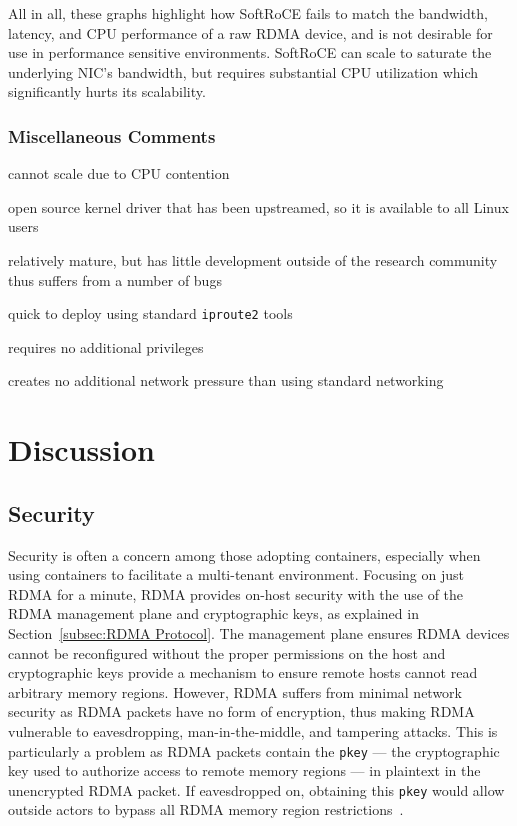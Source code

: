\documentclass[12pt,titlepage]{article}
\begin{document}
All in all, these graphs highlight how SoftRoCE fails to match the bandwidth, latency, and CPU performance of a raw RDMA device, and is not desirable for use in performance sensitive environments.
SoftRoCE can scale to saturate the underlying NIC's bandwidth, but requires substantial CPU utilization which significantly hurts its scalability.

\subsubsection*{Miscellaneous Comments}
\begin{description}[nolistsep,font={{\scshape\bfseries}}]
	\item[Scalability Limits] cannot scale due to CPU contention
	\item[Proprietary] open source kernel driver that has been upstreamed, so it is available to all Linux users
	\item[Maturity] relatively mature, but has little development outside of the research community thus suffers from a number of bugs~\cite{softrocedriver}
	\item[Ease in Deployment] quick to deploy using standard \texttt{iproute2} tools
	\item[Execution Privileges] requires no additional privileges
	\item[Network Pressure] creates no additional network pressure than using standard networking
\end{description}

\section{Discussion}
\subsection{Security}
Security is often a concern among those adopting containers, especially when using containers to facilitate a multi-tenant environment.
Focusing on just RDMA for a minute, RDMA provides on-host security with the use of the RDMA management plane and cryptographic keys, as explained in Section~\ref{subsec:RDMA Protocol}.
The management plane ensures RDMA devices cannot be reconfigured without the proper permissions on the host and cryptographic keys provide a mechanism to ensure remote hosts cannot read arbitrary memory regions.
However, RDMA suffers from minimal network security as RDMA packets have no form of encryption, thus making RDMA vulnerable to eavesdropping, man-in-the-middle, and tampering attacks.
This is particularly a problem as RDMA packets contain the \texttt{pkey} --- the cryptographic key used to authorize access to remote memory regions --- in plaintext in the unencrypted RDMA packet.
If eavesdropped on, obtaining this \texttt{pkey} would allow outside actors to bypass all RDMA memory region restrictions~\cite{rdmasecurity}.
\end{document}
